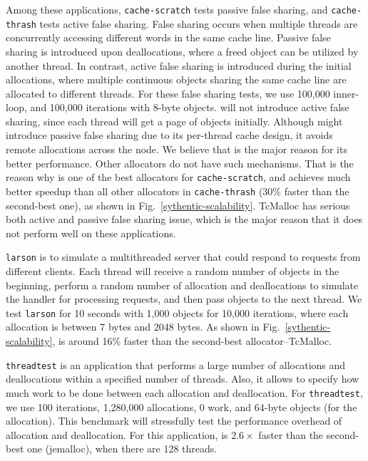 Among these applications, \texttt{cache-scratch} tests passive false sharing, and \texttt{cache-thrash} tests active false sharing. False sharing occurs when multiple threads are concurrently accessing different words in the same cache line. 
Passive false sharing is introduced upon deallocations, where a freed object can be utilized by another thread. In contrast, active false sharing is introduced during the initial allocations, where multiple continuous objects sharing the same cache line are allocated to different threads. For these false sharing tests, we use 100,000 inner-loop, and 100,000 iterations with 8-byte objects. \NM{} will not introduce active false sharing, since each thread will get a page of objects initially. Although \NM{} might introduce passive false sharing due to its per-thread cache design, it avoids remote allocations across the node. We believe that is the major reason for its better performance. Other allocators do not have such mechanisms. That is the reason why \NM{} is one of the best allocators for
 \texttt{cache-scratch}, and achieves much better speedup than all other allocators in \texttt{cache-thrash} (30\% faster than the second-best one), as shown in Fig.~\ref{sythentic-scalability}. TcMalloc has serious both active and passive false sharing issue, which is the major reason that it does not perform well on these applications.  

 \texttt{larson} is to simulate a multithreaded server that could respond to requests from different clients. Each thread  will receive a random number of objects in the beginning, perform a random number of allocation and deallocations to simulate the handler for processing requests, and then pass objects to the next thread. We test \texttt{larson} for 10 seconds with 1,000 objects for 10,000 iterations, where each allocation is between 7 bytes and 2048 bytes. As shown in Fig.~\ref{sythentic-scalability}, \NM{} is around 16\% faster than the second-best allocator--TcMalloc.   


\texttt{threadtest} is an application that performs a large number of allocations and deallocations within a specified number of threads. Also, it allows to specify how much work to be done between each allocation and deallocation. For \texttt{threadtest}, we use 100 iterations, 1,280,000 allocations, 0 work, and 64-byte objects (for the allocation).  This benchmark will stressfully test the performance overhead of allocation and deallocation. For this application, \NM{} is $2.6\times$ faster than the second-best one (jemalloc), when there are 128 threads. %



